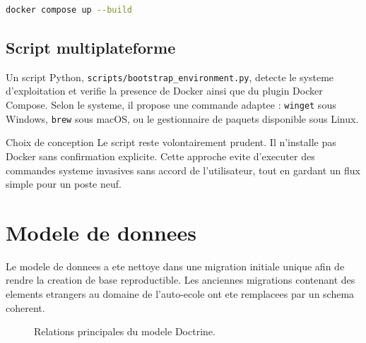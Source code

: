 \documentclass[11pt,a4paper]{article}
\begin{document}
\begin{lstlisting}[language=bash,caption={Lancement Docker principal}]
docker compose up --build
\end{lstlisting}

\subsection{Script multiplateforme}

Un script Python, \texttt{scripts/bootstrap\_environment.py}, detecte le systeme d'exploitation et verifie la presence de Docker ainsi que du plugin Docker Compose. Selon le systeme, il propose une commande adaptee : \texttt{winget} sous Windows, \texttt{brew} sous macOS, ou le gestionnaire de paquets disponible sous Linux.

\begin{decisionbox}{Choix de conception}
Le script reste volontairement prudent. Il n'installe pas Docker sans confirmation explicite. Cette approche evite d'executer des commandes systeme invasives sans accord de l'utilisateur, tout en gardant un flux simple pour un poste neuf.
\end{decisionbox}

\section{Modele de donnees}

Le modele de donnees a ete nettoye dans une migration initiale unique afin de rendre la creation de base reproductible. Les anciennes migrations contenant des elements etrangers au domaine de l'auto-ecole ont ete remplacees par un schema coherent.

\begin{figure}[H]
\centering
{}
\caption{Relations principales du modele Doctrine.}
\end{figure}
\end{document}
